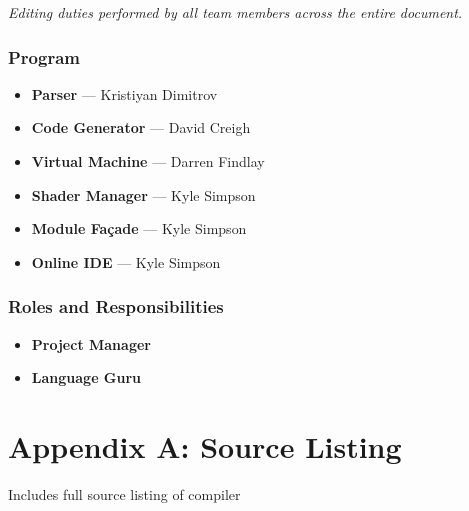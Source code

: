 \documentclass{l3proj}
\begin{document}
\textit{Editing duties performed by all team members across the entire document.}
\subsection{Program}
\label{cont-prog}
\begin{itemize}
\item \textbf{Parser} --- Kristiyan Dimitrov
\item \textbf{Code Generator} --- David Creigh
\item \textbf{Virtual Machine} --- Darren Findlay
\item \textbf{Shader Manager} --- Kyle Simpson
\item \textbf{Module Fa\c{c}ade} --- Kyle Simpson
\item \textbf{Online IDE} --- Kyle Simpson
\end{itemize}
\subsection{Roles and Responsibilities}
\label{cont-prog}
\begin{itemize}
\item \textbf{Project Manager}
\item \textbf{Language Guru}
\end{itemize}

\appendix
\chapter{Appendix A: Source Listing}
\label{appa}

Includes full source listing of compiler



\end{document}
